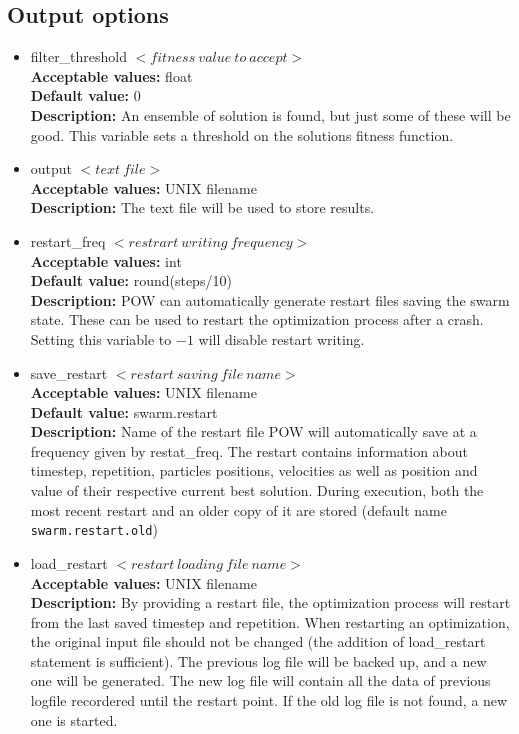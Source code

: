 \documentclass[a4paper, 12pt]{article}
\begin{document}
\subsection{Output options}

\begin{itemize}

\item filter\_threshold $< fitness\ value\ to\ accept >$\\ 
\textbf{Acceptable values:} float\\
\textbf{Default value:} 0\\
\textbf{Description:} An ensemble of solution is found, but just some of these will be good. This variable sets a threshold on the solutions fitness function.

\item output $< text\ file >$\\
\textbf{Acceptable values:} UNIX filename\\
\textbf{Description:} The text file will be used to store results.
 
\item restart\_freq $< restrart\ writing\ frequency >$\\
\textbf{Acceptable values:} int\\
\textbf{Default value:} round(steps/10)\\
\textbf{Description:} POW can automatically generate restart files saving the swarm state. These can be used to restart the optimization process after a crash. Setting this variable to $-1$ will disable restart writing.

\item save\_restart $< restart\ saving\ file\ name >$\\
\textbf{Acceptable values:} UNIX filename\\
\textbf{Default value:} swarm.restart\\
\textbf{Description:} Name of the restart file POW will automatically save at a frequency given by restat\_freq. The restart contains information about timestep, repetition, particles positions, velocities as well as position and value of their respective current best solution. During execution, both the most recent restart and an older copy of it are stored (default name \texttt{swarm.restart.old})
 
\item load\_restart $< restart\ loading\ file\ name >$\\
\textbf{Acceptable values:} UNIX filename\\
\textbf{Description:} By providing a restart file, the optimization process will restart from the last saved timestep and repetition. When restarting an optimization, the original input file should not be changed (the addition of load\_restart statement is sufficient). The previous log file will be backed up, and a new one will be generated. The new log file will contain all the data of previous logfile recordered until the restart point. If the old log file is not found, a new one is started.

\end{itemize}
\end{document}
